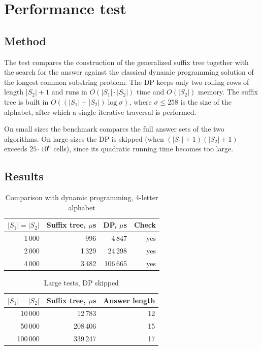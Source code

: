 \section{Performance test}

\subsection{Method}

The test compares the construction of the generalized suffix tree together with the search for
the answer against the classical dynamic programming solution of the longest common substring
problem. The DP keeps only two rolling rows of length $|S_2|+1$ and runs in
$O(|S_1|\cdot|S_2|)$ time and $O(|S_2|)$ memory. The suffix tree is built in
$O((|S_1|+|S_2|) \log \sigma)$, where $\sigma \le 258$ is the size of the alphabet,
after which a single iterative traversal is performed.

On small sizes the benchmark compares the full answer sets of the two algorithms. On large sizes
the DP is skipped (when $(|S_1|+1)(|S_2|+1)$ exceeds $25 \cdot 10^6$ cells), since its quadratic
running time becomes too large.

\subsection{Results}

\begin{table}[!ht]
\centering
\begin{tabular}{|r|r|r|r|}
\hline
\rowcolor{lightgray}
$|S_1|=|S_2|$ & Suffix tree, $\mu$s & DP, $\mu$s & Check \\
\hline
1\,000 & 996 & 4\,847 & yes \\
\hline
2\,000 & 1\,329 & 24\,298 & yes \\
\hline
4\,000 & 3\,482 & 106\,665 & yes \\
\hline
\end{tabular}
\caption{Comparison with dynamic programming, 4-letter alphabet}
\end{table}

\begin{table}[!ht]
\centering
\begin{tabular}{|r|r|r|}
\hline
\rowcolor{lightgray}
$|S_1|=|S_2|$ & Suffix tree, $\mu$s & Answer length \\
\hline
10\,000 & 12\,783 & 12 \\
\hline
50\,000 & 208\,406 & 15 \\
\hline
100\,000 & 339\,247 & 17 \\
\hline
\end{tabular}
\caption{Large tests, DP skipped}
\end{table}

